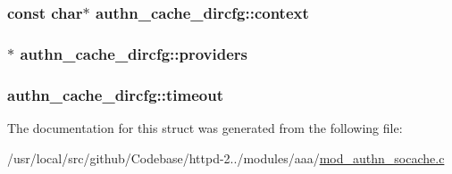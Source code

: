 \subsubsection[{\texorpdfstring{context}{context}}]{\setlength{\rightskip}{0pt plus 5cm}const char$\ast$ authn\+\_\+cache\+\_\+dircfg\+::context}\hypertarget{structauthn__cache__dircfg_a5c92c0961f794bf12659b9f183beeaa7}{}\label{structauthn__cache__dircfg_a5c92c0961f794bf12659b9f183beeaa7}
\subsubsection[{\texorpdfstring{providers}{providers}}]{$\ast$ authn\+\_\+cache\+\_\+dircfg\+::providers}\hypertarget{structauthn__cache__dircfg_a6e135f353391d4456b8ede7d3e31c47e}{}\label{structauthn__cache__dircfg_a6e135f353391d4456b8ede7d3e31c47e}
\subsubsection[{\texorpdfstring{timeout}{timeout}}]{ authn\+\_\+cache\+\_\+dircfg\+::timeout}\hypertarget{structauthn__cache__dircfg_a4354c3df3fd659e5aef8a84b9752de92}{}\label{structauthn__cache__dircfg_a4354c3df3fd659e5aef8a84b9752de92}


The documentation for this struct was generated from the following file\+:\begin{DoxyCompactItemize}
\item 
/usr/local/src/github/\+Codebase/httpd-\/2../modules/aaa/\hyperlink{mod__authn__socache_8c}{mod\+\_\+authn\+\_\+socache.\+c}\end{DoxyCompactItemize}
